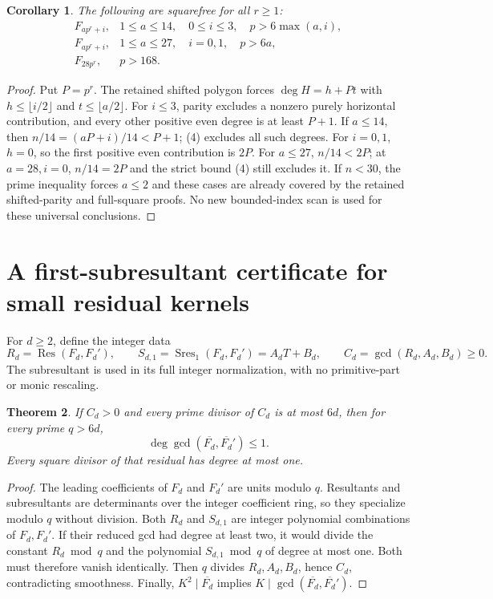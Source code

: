 \documentclass[11pt]{article}
\newtheorem{theorem}{Theorem}
\newtheorem{corollary}[theorem]{Corollary}
\begin{document}
\begin{corollary}\label{cor:blocks}
The following are squarefree for all $r\ge1$:
\[
 \begin{array}{ll}
 F_{ap^r+i},&1\le a\le14,\quad0\le i\le3,\quad p>6\max(a,i),\\
 F_{ap^r+i},&1\le a\le27,\quad i=0,1,\quad p>6a,\\
 F_{28p^r},&p>168.
 \end{array} \tag{6}
\]
\end{corollary}
\begin{proof}
Put $P=p^r$. The retained shifted polygon forces
$\deg H=h+Pt$ with $h\le\lfloor i/2\rfloor$ and
$t\le\lfloor a/2\rfloor$. For $i\le3$, parity excludes a nonzero
purely horizontal contribution, and every other positive even degree
is at least $P+1$. If $a\le14$, then
$n/14=(aP+i)/14<P+1$; (4) excludes all such degrees.
For $i=0,1$, $h=0$, so the first positive even contribution is $2P$.
For $a\le27$, $n/14<2P$; at $a=28,i=0$, $n/14=2P$ and the
strict bound (4) still excludes it. If $n<30$, the prime inequality
forces $a\le2$ and these cases are already covered by the retained
shifted-parity and full-square proofs. No new bounded-index scan is
used for these universal conclusions.
\end{proof}

\section{A first-subresultant certificate for small residual kernels}
For $d\ge2$, define the integer data
\[
 R_d=\operatorname{Res}(F_d,F_d'),\qquad
 S_{d,1}=\operatorname{Sres}_1(F_d,F_d')=A_dT+B_d,
 \qquad C_d=\gcd(R_d,A_d,B_d)\ge0. \tag{7}
\]
The subresultant is used in its full integer normalization, with no
primitive-part or monic rescaling.

\begin{theorem}\label{thm:subres}
If $C_d>0$ and every prime divisor of $C_d$ is at most $6d$, then
for every prime $q>6d$,
\[
 \deg\gcd(\overline{F_d},\overline{F_d}')\le1. \tag{8}
\]
Every square divisor of that residual has degree at most one.
\end{theorem}
\begin{proof}
The leading coefficients of $F_d$ and $F_d'$ are units modulo $q$.
Resultants and subresultants are determinants over the integer
coefficient ring, so they specialize modulo $q$ without division.
Both $R_d$ and $S_{d,1}$ are integer polynomial combinations of
$F_d,F_d'$. If their reduced gcd had degree at least two, it would
divide the constant $R_d\bmod q$ and the polynomial $S_{d,1}\bmod q$
of degree at most one. Both must therefore vanish identically.
Then $q$ divides $R_d,A_d,B_d$, hence $C_d$, contradicting smoothness.
Finally, $K^2\mid\overline{F_d}$ implies
$K\mid\gcd(\overline{F_d},\overline{F_d}')$.
\end{proof}
\end{document}
